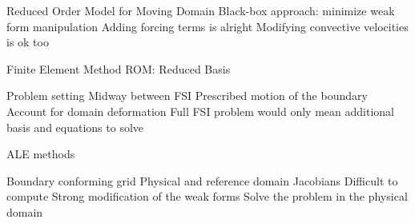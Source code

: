 \documentclass[../main.tex]{subfiles}
\begin{document}
Reduced Order Model for Moving Domain
Black-box approach: minimize weak form manipulation
Adding forcing terms is alright
Modifying convective velocities is ok too

Finite Element Method
ROM: Reduced Basis

Problem setting
Midway between FSI
Prescribed motion of the boundary
Account for domain deformation
Full FSI problem would only mean additional basis and equations to solve


ALE methods

Boundary conforming grid
Physical and reference domain
Jacobians
    Difficult to compute
    Strong modification of the weak forms
Solve the problem in the physical domain
\end{document}
